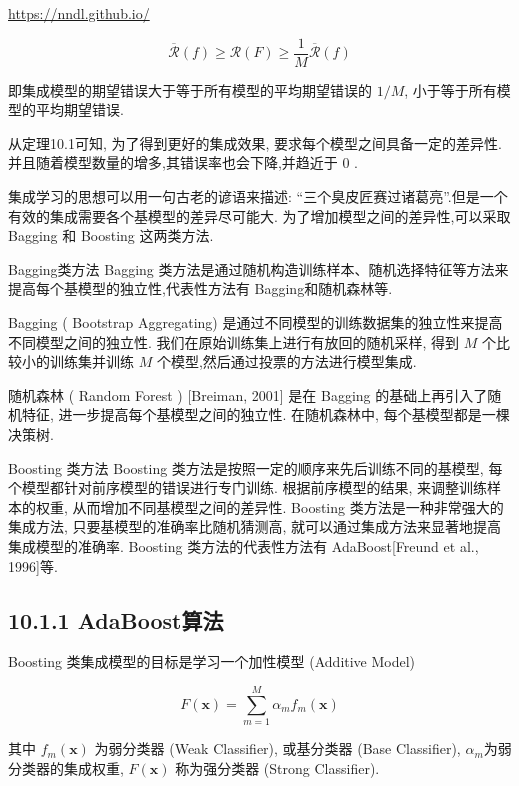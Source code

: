 \documentclass[10pt]{article}
\begin{document}
\href{https://nndl.github.io/}{https://nndl.github.io/}


\begin{equation*}
\overline{\mathcal{R}}(f) \geq \mathcal{R}(F) \geq \frac{1}{M} \overline{\mathcal{R}}(f) \tag{10.9}
\end{equation*}


即集成模型的期望错误大于等于所有模型的平均期望错误的 $1 / M$, 小于等于所有模型的平均期望错误.

从定理10.1可知, 为了得到更好的集成效果, 要求每个模型之间具备一定的差异性. 并且随着模型数量的增多,其错误率也会下降,并趋近于 0 .

集成学习的思想可以用一句古老的谚语来描述: “三个臭皮匠赛过诸葛亮”.但是一个有效的集成需要各个基模型的差异尽可能大. 为了增加模型之间的差异性,可以采取 Bagging 和 Boosting 这两类方法.

Bagging类方法 Bagging 类方法是通过随机构造训练样本、随机选择特征等方法来提高每个基模型的独立性,代表性方法有 Bagging和随机森林等.

Bagging ( Bootstrap Aggregating) 是通过不同模型的训练数据集的独立性来提高不同模型之间的独立性. 我们在原始训练集上进行有放回的随机采样, 得到 $M$ 个比较小的训练集并训练 $M$ 个模型,然后通过投票的方法进行模型集成.

随机森林 ( Random Forest ) [Breiman, 2001] 是在 Bagging 的基础上再引入了随机特征, 进一步提高每个基模型之间的独立性. 在随机森林中, 每个基模型都是一棵决策树.

Boosting 类方法 Boosting 类方法是按照一定的顺序来先后训练不同的基模型, 每个模型都针对前序模型的错误进行专门训练. 根据前序模型的结果, 来调整训练样本的权重, 从而增加不同基模型之间的差异性. Boosting 类方法是一种非常强大的集成方法, 只要基模型的准确率比随机猜测高, 就可以通过集成方法来显著地提高集成模型的准确率. Boosting 类方法的代表性方法有 AdaBoost[Freund et al., 1996]等.

\subsection*{10.1.1 AdaBoost算法}
Boosting 类集成模型的目标是学习一个加性模型 (Additive Model)


\begin{equation*}
F(\boldsymbol{x})=\sum_{m=1}^{M} \alpha_{m} f_{m}(\boldsymbol{x}) \tag{10.10}
\end{equation*}


其中 $f_{m}(\boldsymbol{x})$ 为弱分类器 (Weak Classifier), 或基分类器 (Base Classifier), $\alpha_{m}$为弱分类器的集成权重, $F(\boldsymbol{x})$ 称为强分类器 (Strong Classifier).
\end{document}

